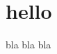 \chapter{hello}\label{hello}

bla bla bla

\begin{Shaded}
\begin{Highlighting}[]
  
\end{Highlighting}
\end{Shaded}

